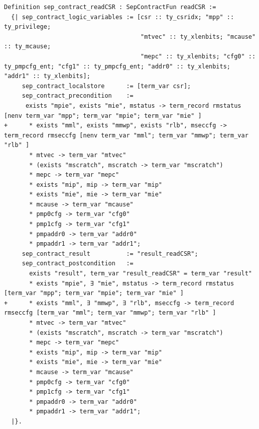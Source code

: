 \begin{verbatim}
Definition sep_contract_readCSR : SepContractFun readCSR :=
  {| sep_contract_logic_variables := [csr :: ty_csridx; "mpp" :: ty_privilege;
                                      "mtvec" :: ty_xlenbits; "mcause" :: ty_mcause;
                                      "mepc" :: ty_xlenbits; "cfg0" :: ty_pmpcfg_ent; "cfg1" :: ty_pmpcfg_ent; "addr0" :: ty_xlenbits; "addr1" :: ty_xlenbits];
     sep_contract_localstore      := [term_var csr];
     sep_contract_precondition    :=
      exists "mpie", exists "mie", mstatus -> term_record rmstatus [nenv term_var "mpp"; term_var "mpie"; term_var "mie" ]
+      * exists "mml", exists "mmwp", exists "rlb", mseccfg -> term_record rmseccfg [nenv term_var "mml"; term_var "mmwp"; term_var "rlb" ]
       * mtvec -> term_var "mtvec"
       * (exists "mscratch", mscratch -> term_var "mscratch")
       * mepc -> term_var "mepc"
       * exists "mip", mip -> term_var "mip"
       * exists "mie", mie -> term_var "mie"
       * mcause -> term_var "mcause"
       * pmp0cfg -> term_var "cfg0"
       * pmp1cfg -> term_var "cfg1"
       * pmpaddr0 -> term_var "addr0"
       * pmpaddr1 -> term_var "addr1";
     sep_contract_result          := "result_readCSR";
     sep_contract_postcondition   :=
       exists "result", term_var "result_readCSR" = term_var "result"
       * exists "mpie", ∃ "mie", mstatus -> term_record rmstatus [term_var "mpp"; term_var "mpie"; term_var "mie" ]
+      * exists "mml", ∃ "mmwp", ∃ "rlb", mseccfg -> term_record rmseccfg [term_var "mml"; term_var "mmwp"; term_var "rlb" ]
       * mtvec -> term_var "mtvec"
       * (exists "mscratch", mscratch -> term_var "mscratch")
       * mepc -> term_var "mepc"
       * exists "mip", mip -> term_var "mip"
       * exists "mie", mie -> term_var "mie"
       * mcause -> term_var "mcause"
       * pmp0cfg -> term_var "cfg0"
       * pmp1cfg -> term_var "cfg1"
       * pmpaddr0 -> term_var "addr0"
       * pmpaddr1 -> term_var "addr1";
  |}.
\end{verbatim}
